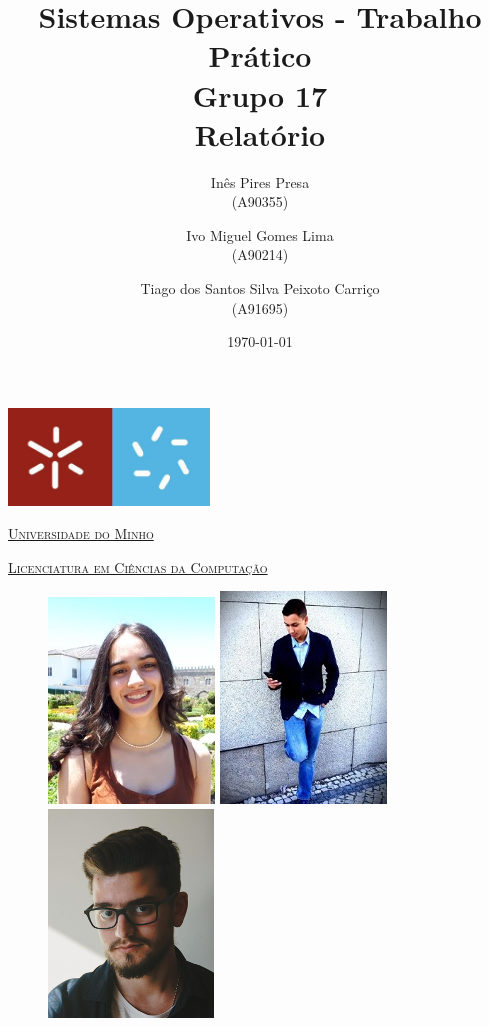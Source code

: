 \documentclass[11pt,a4paper]{report}
\title{Sistemas Operativos - Trabalho Prático\\
       \textbf{Grupo 17}\\ Relatório
       } %
\author{Inês Pires Presa\\ (A90355)\and Ivo Miguel Gomes Lima\\ (A90214)\and Tiago dos Santos Silva Peixoto Carriço \\ (A91695)
       } %
\date{\today} %
\begin{document}
	\begin{minipage}{0.9\linewidth}
        \centering
		\includegraphics[width=0.4\textwidth]{um.jpeg}\par\vspace{1cm}
                \href{https://www.uminho.pt/PT}
		{\scshape\LARGE Universidade do Minho} \par
		\vspace{0.6cm}
                \href{https://lcc.di.uminho.pt}
		{\scshape\Large Licenciatura em Ciências da Computação} \par
		\maketitle
		\begin{figure}[H]
			\includegraphics[width=0.32\linewidth]{ines.jpg}
			\includegraphics[width=0.32\linewidth]{ivo.jpg}
			\includegraphics[width=0.32\linewidth]{tiago.jpg}
		\end{figure}
	\end{minipage}
\end{document}
